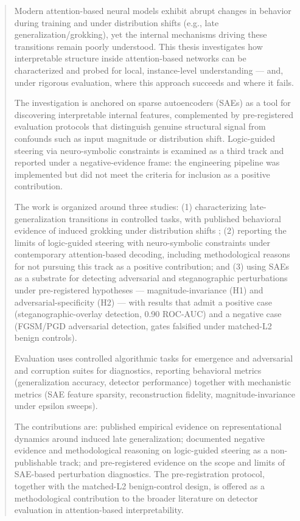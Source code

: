 ﻿\documentclass[../ppgc-tese.tex]{subfiles}
\begin{document}
\begin{abstract}
Modern attention-based neural models exhibit abrupt changes in behavior during training and under distribution shifts (e.g., late generalization/grokking), yet the internal mechanisms driving these transitions remain poorly understood. This thesis investigates how interpretable structure inside attention-based networks can be characterized and probed for local, instance-level understanding --- and, under rigorous evaluation, where this approach succeeds and where it fails.

The investigation is anchored on sparse autoencoders (SAEs) as a tool for discovering interpretable internal features, complemented by pre-registered evaluation protocols that distinguish genuine structural signal from confounds such as input magnitude or distribution shift. Logic-guided steering via neuro-symbolic constraints is examined as a third track and reported under a negative-evidence frame: the engineering pipeline was implemented but did not meet the criteria for inclusion as a positive contribution.

The work is organized around three studies: (1) characterizing late-generalization transitions in controlled tasks, with published behavioral evidence of induced grokking under distribution shifts \cite{carvalho2025inducing_grokking_distribution_shifts}; (2) reporting the limits of logic-guided steering with neuro-symbolic constraints under contemporary attention-based decoding, including methodological reasons for not pursuing this track as a positive contribution; and (3) using SAEs as a substrate for detecting adversarial and steganographic perturbations under pre-registered hypotheses --- magnitude-invariance (H1) and adversarial-specificity (H2) --- with results that admit a positive case (steganographic-overlay detection, 0.90 ROC-AUC) and a negative case (FGSM/PGD adversarial detection, gates falsified under matched-L2 benign controls).

Evaluation uses controlled algorithmic tasks for emergence and adversarial and corruption suites for diagnostics, reporting behavioral metrics (generalization accuracy, detector performance) together with mechanistic metrics (SAE feature sparsity, reconstruction fidelity, magnitude-invariance under epsilon sweeps).

The contributions are: published empirical evidence on representational dynamics around induced late generalization; documented negative evidence and methodological reasoning on logic-guided steering as a non-publishable track; and pre-registered evidence on the scope and limits of SAE-based perturbation diagnostics. The pre-registration protocol, together with the matched-L2 benign-control design, is offered as a methodological contribution to the broader literature on detector evaluation in attention-based interpretability.
\end{abstract}
\end{document}
